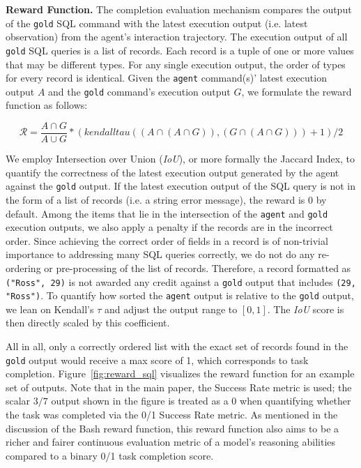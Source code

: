 \textbf{Reward Function.} The completion evaluation mechanism compares the output of the \texttt{gold} SQL command with the latest execution output (i.e. latest observation) from the agent's interaction trajectory. The execution output of all \texttt{gold} SQL queries is a list of records. Each record is a tuple of one or more values that may be different types. For any single execution output, the order of types for every record is identical. Given the \texttt{agent} command(s)' latest execution output $A$ and the \texttt{gold} command's execution output $G$, we formulate the reward function as follows:

\begin{equation}
    \label{eq:reward_sql}
    \mathcal{R} = \frac{A \cap G}{A \cup G} * (kendalltau((A \cap (A \cap G)), (G \cap (A \cap G))) + 1) / 2
\end{equation}

We employ Intersection over Union (\textit{IoU}), or more formally the Jaccard Index, to quantify the correctness of the latest execution output generated by the agent against the \texttt{gold} output. If the latest execution output of the SQL query is not in the form of a list of records (i.e. a string error message), the reward is $0$ by default. Among the items that lie in the intersection of the \texttt{agent} and \texttt{gold} execution outputs, we also apply a penalty if the records are in the incorrect order. Since achieving the correct order of fields in a record is of non-trivial importance to addressing many SQL queries correctly, we do not do any re-ordering or pre-processing of the list of records. Therefore, a record formatted as \texttt{("Ross", 29)} is not awarded any credit against a \texttt{gold} output that includes \texttt{(29, "Ross")}. To quantify how sorted the \texttt{agent} output is relative to the \texttt{gold} output, we lean on Kendall's $\tau$ and adjust the output range to $[0, 1]$. The \textit{IoU} score is then directly scaled by this coefficient.

All in all, only a correctly ordered list with the exact set of records found in the \texttt{gold} output would receive a max score of 1, which corresponds to task completion.
Figure~\ref{fig:reward_sql} visualizes the reward function for an example set of outputs. Note that in the main paper, the Success Rate metric is used; the scalar $3/7$ output shown in the figure is treated as a 0 when quantifying whether the task was completed via the 0/1 Success Rate metric. As mentioned in the discussion of the Bash reward function, this reward function also aims to be a richer and fairer continuous evaluation metric of a model's reasoning abilities compared to a binary 0/1 task completion score.
